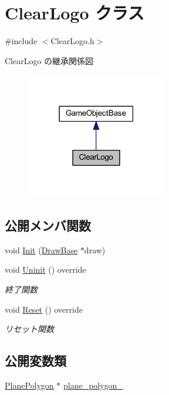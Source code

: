 \hypertarget{class_clear_logo}{}\section{Clear\+Logo クラス}
\label{class_clear_logo}


{\ttfamily \#include $<$Clear\+Logo.\+h$>$}



Clear\+Logo の継承関係図\nopagebreak
\begin{figure}[H]
\begin{center}
\leavevmode
\includegraphics[width=174pt]{class_clear_logo__inherit__graph}
\end{center}
\end{figure}
\subsection*{公開メンバ関数}
\begin{DoxyCompactItemize}
\item 
void \mbox{\hyperlink{class_clear_logo_a46c1a948342d75bb418047a31e70999d}{Init}} (\mbox{\hyperlink{class_draw_base}{Draw\+Base}} $\ast$draw)
\item 
void \mbox{\hyperlink{class_clear_logo_ab55def116615b92a8e8cc40b364b7a4c}{Uninit}} () override
\begin{DoxyCompactList}\small\item\em 終了関数 \end{DoxyCompactList}\item 
void \mbox{\hyperlink{class_clear_logo_aa19369cbace0cc79957ef7b4d4dbd0f5}{Reset}} () override
\begin{DoxyCompactList}\small\item\em リセット関数 \end{DoxyCompactList}\end{DoxyCompactItemize}
\subsection*{公開変数類}
\begin{DoxyCompactItemize}
\item 
\mbox{\hyperlink{class_plane_polygon}{Plane\+Polygon}} $\ast$ \mbox{\hyperlink{class_clear_logo_ad4c1abbd7e501cc44357c9f65e12482f}{plane\+\_\+polygon\+\_\+}}
\end{DoxyCompactItemize}
